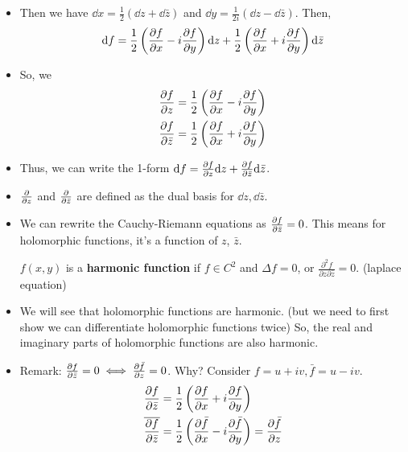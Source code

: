 \documentclass[a4paper,12pt]{article}
\begin{document}
\begin{itemize}
    \item Then we have $\dd x=\frac{1}{2}(\dd z+\dd\bar z)$ and $\dd y=\frac{1}{2i}(\dd z-\dd\bar z)$. Then, \begin{align}
        \dd f=\frac{1}{2}\left(\partialderivative{f}{x}-i\partialderivative{f}{y}\right)\dd z+\frac{1}{2}\left(\partialderivative{f}{x}+i\partialderivative{f}{y}\right)\dd\bar z
    \end{align}
    \item So, we \begin{align}
        \partialderivative{f}{z}=\frac{1}{2}\left(\partialderivative{f}{x}-i\partialderivative{f}{y}\right)\\
        \partialderivative{f}{\bar z}=\frac{1}{2}\left(\partialderivative{f}{x}+i\partialderivative{f}{y}\right)
    \end{align}
    \item Thus, we can write the 1-form $\dd f=\partialderivative{f}{z}\dd z+\partialderivative{f}{\bar z}\dd\bar z$.
    \item $\partialderivative{}{z}$ and $\partialderivative{}{\bar z}$ are defined as the dual basis for $\dd z,\dd\bar z$.
    \item We can rewrite the Cauchy-Riemann equations as $\partialderivative{f}{\bar z}=0$. This means for holomorphic functions, it's  a function of $z$,  $\bar z$.
    \begin{definition}
        $f(x,y)$ is a \textbf{harmonic function} if $f\in C^2$ and $\Delta f=0$, or $\frac{\partial^2f}{\partial z\partial\bar z}=0$. (laplace equation) 
    \end{definition}
    \item We will see that holomorphic functions are harmonic. (but we need to first show we can differentiate holomorphic functions twice) So, the real and imaginary parts of holomorphic functions are also harmonic.
    \item Remark: $\partialderivative{f}{\bar z}=0\iff\partialderivative{\bar f}{z}=0$. Why? Consider $f=u+iv,\bar f=u-iv$.
    \begin{align}
        \partialderivative{f}{\bar z}&=\frac{1}{2}\left(\partialderivative{f}{x}+i\partialderivative{f}{y}\right)\\
        \overline{\partialderivative{f}{\bar z}}&=\frac{1}{2}\left(\partialderivative{\bar f}{x}-i\partialderivative{\bar f}{y}\right)=\partialderivative{\bar f}{z}\\
    \end{align}

\end{itemize}
\end{document}
